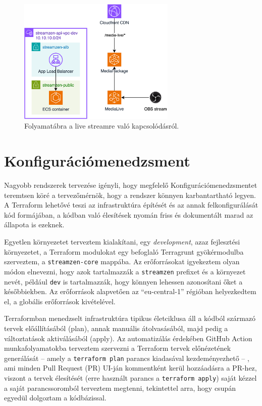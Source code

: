 \begin{figure}[]
	\centering
	\includegraphics[height=60mm, keepaspectratio]{figures/dipterv_live2.png}
	\caption{Folyamatábra a live streamre való kapcsolódásról.}
	\label{fig:live2}
\end{figure}

\section{Konfigurációmenedzsment}\label{sec:config}

Nagyobb rendszerek tervezése igényli, hogy megfelelő Konfigurációmenedzsmentet teremtsen köré a tervezőmérnök, hogy a rendszer könnyen karbantartható legyen. A Terraform lehetővé teszi az infrastruktúra építését és az annak felkonfigurálását kód formájában, a kódban való élesítések nyomán friss és dokumentált marad az állapota is ezeknek.

Egyetlen környezetet terveztem kialakítani, egy \emph{development}, azaz fejlesztési környezetet, a Terraform modulokat egy befoglaló Terragrunt gyökérmodulba szerveztem, a \verb|streamzen-core| mappába. Az erőforrásokat igyekeztem olyan módon elnevezni, hogy azok tartalmazzák a \verb|streamzen| prefixet és a környezet nevét, például \verb|dev| is tartalmazzák, hogy könnyen lehessen azonosítani őket a későbbiekben. Az erőforrások alapvetően az ``eu-central-1'' régióban helyezkedtem el, a globális erőforrások kivételével.

Terraformban menedzselt infrastruktúra tipikus életciklusa áll a kódból származó tervek előállításából (plan), annak manuális átolvasásából, majd pedig a változtatások aktiválásából (apply). Az automatizálás érdekében GitHub Action munkafolyamatokba terveztem szervezni a Terraform tervek előnézetének generálását -- amely a \verb|terraform plan| parancs kiadasával kezdeményezhető -- , ami minden Pull Request (PR) UI-ján kommentként kerül hozzáadásra a PR-hez, viszont a tervek élesítését (erre használt parancs a \verb|terraform apply|) saját kézzel a saját parancssoromból terveztem megtenni, tekintettel arra, hogy csupán egyedül dolgoztam a kódbázissal.

